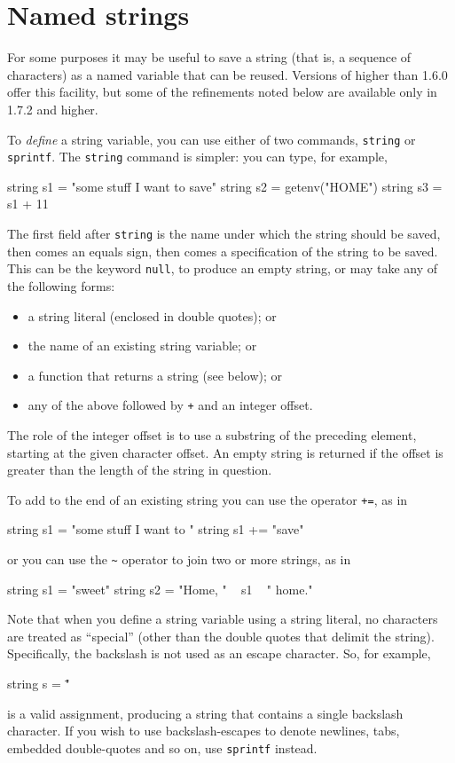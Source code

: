\section{Named strings}
\label{sec:named-strings}

For some purposes it may be useful to save a string (that is, a
sequence of characters) as a named variable that can be reused.
Versions of  higher than 1.6.0 offer this facility, but
some of the refinements noted below are available only in 
1.7.2 and higher.

To \textit{define} a string variable, you can use either of two
commands, \texttt{string} or \texttt{sprintf}.  The \texttt{string}
command is simpler: you can type, for example,
%
\begin{code}
string s1 = "some stuff I want to save"
string s2 = getenv("HOME")
string s3 = s1 + 11
\end{code}
%
The first field after \texttt{string} is the name under which the
string should be saved, then comes an equals sign, then comes a
specification of the string to be saved. This can be the keyword
\texttt{null}, to produce an empty string, or may take any of the 
following forms:

\begin{itemize}
\item a string literal (enclosed in double quotes); or
\item the name of an existing string variable; or
\item a function that returns a string (see below); or
\item any of the above followed by \texttt{+} and an integer offset.
\end{itemize}

The role of the integer offset is to use a substring of the preceding
element, starting at the given character offset.  An empty string is
returned if the offset is greater than the length of the string in
question.

To add to the end of an existing string you can use the operator
\texttt{+=}, as in
%
\begin{code}
string s1 = "some stuff I want to "
string s1 += "save"
\end{code}
or you can use the \verb|~| operator to join two or more strings, as
in
\begin{code}
string s1 = "sweet"
string s2 = "Home, " ~ s1 ~ " home."
\end{code}

Note that when you define a string variable using a string literal, no
characters are treated as ``special'' (other than the double quotes
that delimit the string).  Specifically, the backslash is not used as
an escape character.  So, for example,
%
\begin{code}
string s = "\"
\end{code}
%
is a valid assignment, producing a string that contains a single
backslash character.  If you wish to use backslash-escapes to denote
newlines, tabs, embedded double-quotes and so on, use \texttt{sprintf}
instead.

